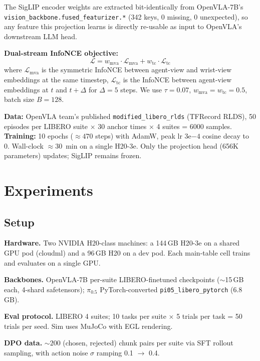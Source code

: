 \documentclass{article}
\begin{document}
The SigLIP encoder weights are extracted bit-identically from OpenVLA-7B's \texttt{vision\_backbone.fused\_\allowbreak featurizer.*} (342 keys, 0 missing, 0 unexpected), so any feature this projection learns is directly re-usable as input to OpenVLA's downstream LLM head.

\textbf{Dual-stream InfoNCE objective:}
\begin{equation}
\mathcal{L} = w_\text{mva} \cdot \mathcal{L}_\text{mva} + w_\text{tc} \cdot \mathcal{L}_\text{tc}
\end{equation}
where \(\mathcal{L}_\text{mva}\) is the symmetric InfoNCE between agent-view and wrist-view embeddings at the same timestep, \(\mathcal{L}_\text{tc}\) is the InfoNCE between agent-view embeddings at \(t\) and \(t{+}\Delta\) for \(\Delta=5\) steps. We use \(\tau = 0.07\), \(w_\text{mva} = w_\text{tc} = 0.5\), batch size \(B = 128\).

\textbf{Data:} OpenVLA team's published \texttt{modified\_libero\_rlds} (TFRecord RLDS), 50 episodes per LIBERO suite \(\times\) 30 anchor times \(\times\) 4 suites = 6000 samples. \textbf{Training:} 10 epochs (\(\approx 470\) steps) with AdamW, peak lr \(3\mathrm{e}{-4}\) cosine decay to 0. Wall-clock \(\approx 30\)~min on a single H20-3e. Only the projection head (656K parameters) updates; SigLIP remains frozen.

\section{Experiments}

\subsection{Setup}

\textbf{Hardware.} Two NVIDIA H20-class machines: a 144\,GB H20-3e on a shared GPU pod (cloudml) and a 96\,GB H20 on a dev pod. Each main-table cell trains and evaluates on a single GPU.

\textbf{Backbones.} OpenVLA-7B per-suite LIBERO-finetuned checkpoints (\(\sim\)15\,GB each, 4-shard safetensors); \(\pi_{0.5}\) PyTorch-converted \texttt{pi05\_libero\_pytorch} (6.8\,GB).

\textbf{Eval protocol.} LIBERO 4 suites; 10 tasks per suite \(\times\) 5 trials per task = 50 trials per seed. Sim uses MuJoCo with EGL rendering.

\textbf{DPO data.} \(\sim 200\) (chosen, rejected) chunk pairs per suite via SFT rollout sampling, with action noise \(\sigma\) ramping 0.1 \(\rightarrow\) 0.4.
\end{document}
